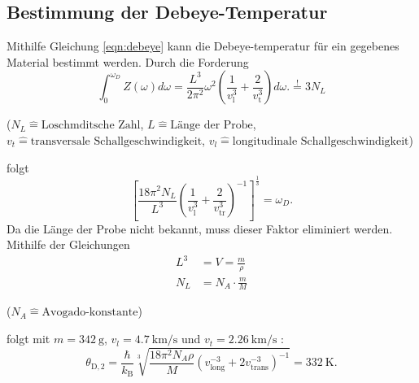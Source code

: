 \subsection{Bestimmung der Debeye-Temperatur}
Mithilfe Gleichung \ref{eqn:debeye} kann die Debeye-temperatur für ein gegebenes Material bestimmt werden.
Durch die Forderung
\begin{equation}
	\int_0^{\omega_D} Z(\omega)d\omega = \frac{L^3}{2\pi^2}\omega^2\left(\frac{1}{v_\text{l}^3}+\frac{2}{v_{\text{t}}^3}\right)d\omega. \overset{!}{=} 3 N_L
	\label{eqn:z}
\end{equation}
\begin{center}
    \tiny{($N_L \hat{=} \text{Loschmditsche Zahl}$, $L \hat{=} \text{Länge der Probe}$, $v_t \hat{=} \text{transversale Schallgeschwindigkeit}$, $v_l \hat{=} \text{longitudinale Schallgeschwindigkeit}$)}
\end{center}
folgt
\begin{equation}
    \left[\frac{18\pi^2N_L}{L^3}\left(\frac{1}{v_\text{l}^3}+\frac{2}{v_\text{tr}^3}\right)^{-1} \right]^{\frac{1}{3}} = \omega_D.
\end{equation}
Da die Länge der Probe nicht bekannt, muss dieser Faktor eliminiert werden. Mithilfe der Gleichungen
\begin{align}
    L^3 &= V = \frac{m}{\rho} \\
    N_L &= N_A \cdot \frac{m}{M}
\end{align}
\begin{center}
    \tiny{($N_A \hat{=} \text{Avogado-konstante}$)}
\end{center}
folgt mit $m = \SI{342}{\gram} $, $v_l = \SI{4,7}{\kilo \meter \per \second} $ und $v_t = \SI{2,26}{\kilo \meter \per \second}$ :
\begin{equation}
    \theta_{\mathrm{D},2}=\frac{\hbar}{k_{\mathrm{B}}}\sqrt[3]{\frac{18\pi^2N_A\rho}{M}\left(v_{\mathrm{long}}^{-3}+2v_{\mathrm{trans}}^{-3}\right)^{-1}}=\SI{332}{\kelvin}.
\end{equation}

